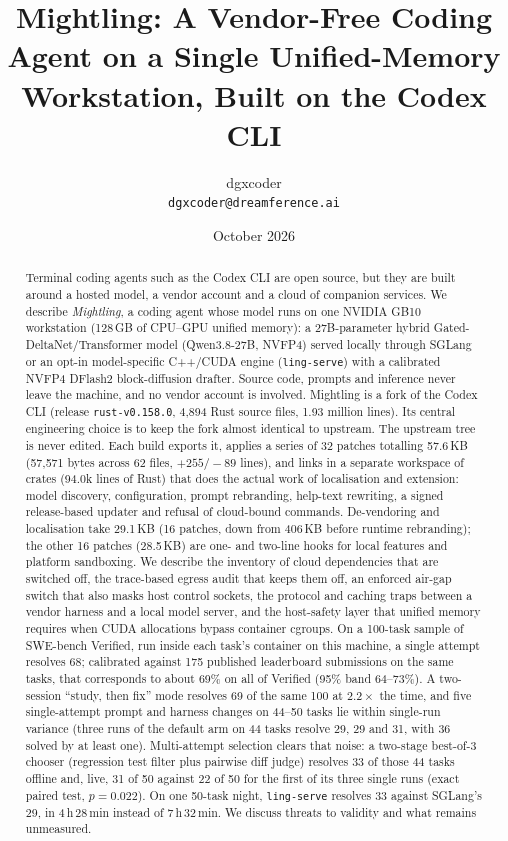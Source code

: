 \documentclass[11pt]{article}
\title{Mightling: A Vendor-Free Coding Agent on a Single Unified-Memory Workstation, Built on
the Codex CLI}
\author{dgxcoder\\ \texttt{dgxcoder@dreamference.ai}}
\date{October 2026}
\newcommand{\code}[1]{\texttt{#1}}
\begin{document}
\maketitle

\begin{abstract}
Terminal coding agents such as the Codex CLI are open source, but they are built around a
hosted model, a vendor account and a cloud of companion services. We describe \emph{Mightling}, a
coding agent whose model runs on one NVIDIA GB10 workstation (128\,GB of CPU--GPU unified memory):
a 27B-parameter hybrid Gated-DeltaNet/Transformer model (Qwen3.8-27B, NVFP4) served locally through
SGLang or an opt-in model-specific C++/CUDA engine (\code{ling-serve}) with a calibrated NVFP4
DFlash2 block-diffusion drafter. Source code, prompts and inference never leave the machine, and no
vendor account is involved. Mightling is a fork of the Codex CLI (release \code{rust-v0.158.0},
4{,}894 Rust source files, 1.93 million lines). Its central engineering choice is to keep the fork
almost identical to upstream. The upstream tree is never edited. Each build exports it, applies a
series of 32 patches totalling 57.6\,KB (57{,}571 bytes across 62 files, $+255/-89$ lines), and
links in a separate workspace of crates (94.0k lines of Rust) that does the actual work of
localisation and extension: model discovery, configuration, prompt rebranding, help-text rewriting,
a signed release-based updater and refusal of cloud-bound commands. De-vendoring and localisation
take 29.1\,KB (16 patches, down from 406\,KB before runtime rebranding); the other 16 patches
(28.5\,KB) are one- and two-line hooks for local features and platform sandboxing. We describe the
inventory of cloud dependencies that are switched off, the trace-based egress audit that keeps them
off, an enforced air-gap switch that also masks host control sockets, the protocol and caching
traps between a vendor harness and a local model server, and the host-safety layer that unified
memory requires when CUDA allocations bypass container cgroups. On a 100-task sample of SWE-bench
Verified, run inside each task's container on this machine, a single attempt resolves 68;
calibrated against 175 published leaderboard submissions on the same tasks, that corresponds to
about 69\% on all of Verified (95\% band 64--73\%). A two-session ``study, then fix'' mode resolves
69 of the same 100 at $2.2\times$ the time, and five single-attempt prompt and harness changes on
44--50 tasks lie within single-run variance (three runs of the default arm on 44 tasks resolve 29,
29 and 31, with 36 solved by at least one). Multi-attempt selection clears that noise: a two-stage best-of-3 chooser (regression test filter
plus pairwise diff judge) resolves 33 of those 44 tasks offline and, live, 31 of 50 against 22 of
50 for the first of its three single runs (exact paired test, $p = 0.022$). On one 50-task night,
\code{ling-serve} resolves 33 against SGLang's 29, in 4\,h\,28\,min instead of 7\,h\,32\,min. We discuss threats
to validity and what remains unmeasured.
\end{abstract}
\end{document}
